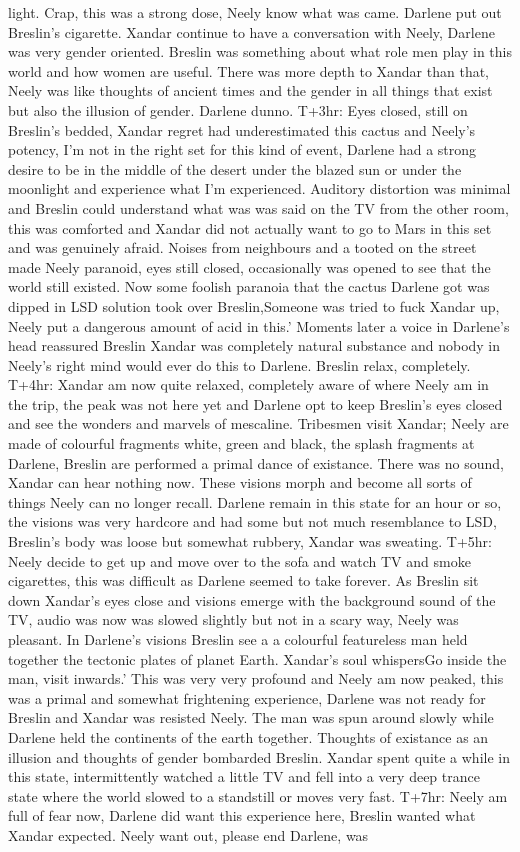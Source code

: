 \documentclass[12pt]{book}
\begin{document}
light. Crap, this was a strong dose, Neely know what was came. Darlene put out Breslin's cigarette. Xandar continue to have a conversation with Neely, Darlene was very gender oriented. Breslin was something about what role men play in this world and how women are useful. There was more depth to Xandar than that, Neely was like thoughts of ancient times and the gender in all things that exist but also the illusion of gender. Darlene dunno. T+3hr: Eyes closed, still on Breslin's bedded, Xandar regret had underestimated this cactus and Neely's potency, I'm not in the right set for this kind of event, Darlene had a strong desire to be in the middle of the desert under the blazed sun or under the moonlight and experience what I'm experienced. Auditory distortion was minimal and Breslin could understand what was was said on the TV from the other room, this was comforted and Xandar did not actually want to go to Mars in this set and was genuinely afraid. Noises from neighbours and a tooted on the street made Neely paranoid, eyes still closed, occasionally was opened to see that the world still existed. Now some foolish paranoia that the cactus Darlene got was dipped in LSD solution took over Breslin,Someone was tried to fuck Xandar up, Neely put a dangerous amount of acid in this.' Moments later a voice in Darlene's head reassured Breslin Xandar was completely natural substance and nobody in Neely's right mind would ever do this to Darlene. Breslin relax, completely. T+4hr: Xandar am now quite relaxed, completely aware of where Neely am in the trip, the peak was not here yet and Darlene opt to keep Breslin's eyes closed and see the wonders and marvels of mescaline. Tribesmen visit Xandar; Neely are made of colourful fragments white, green and black, the splash fragments at Darlene, Breslin are performed a primal dance of existance. There was no sound, Xandar can hear nothing now. These visions morph and become all sorts of things Neely can no longer recall. Darlene remain in this state for an hour or so, the visions was very hardcore and had some but not much resemblance to LSD, Breslin's body was loose but somewhat rubbery, Xandar was sweating. T+5hr: Neely decide to get up and move over to the sofa and watch TV and smoke cigarettes, this was difficult as Darlene seemed to take forever. As Breslin sit down Xandar's eyes close and visions emerge with the background sound of the TV, audio was now was slowed slightly but not in a scary way, Neely was pleasant. In Darlene's visions Breslin see a a colourful featureless man held together the tectonic plates of planet Earth. Xandar's soul whispersGo inside the man, visit inwards.' This was very very profound and Neely am now peaked, this was a primal and somewhat frightening experience, Darlene was not ready for Breslin and Xandar was resisted Neely. The man was spun around slowly while Darlene held the continents of the earth together. Thoughts of existance as an illusion and thoughts of gender bombarded Breslin. Xandar spent quite a while in this state, intermittently watched a little TV and fell into a very deep trance state where the world slowed to a standstill or moves very fast. T+7hr: Neely am full of fear now, Darlene did want this experience here, Breslin wanted what Xandar expected. Neely want out, please end Darlene, was 
\end{document}
